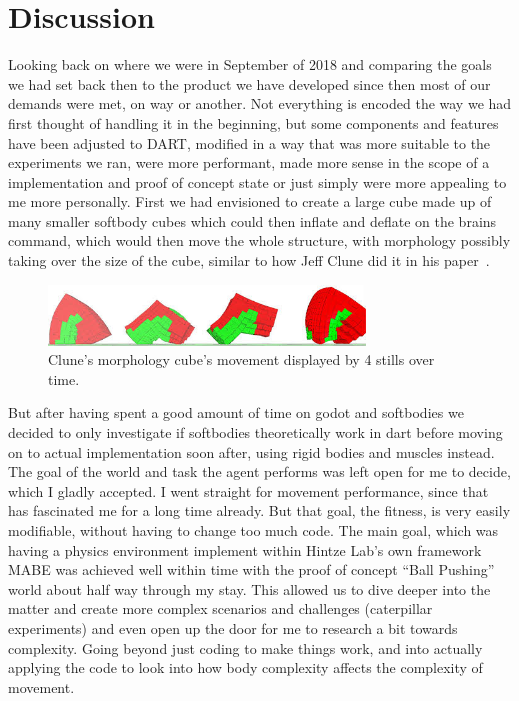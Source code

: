\documentclass[12pt,oneside,listof=totoc,paper=a4,headings=small]{scrbook}
\begin{document}
\section{Discussion}
Looking back on where we were in September of 2018 and comparing the goals we had set back then to the product we have developed since then most of our demands were met, on way or another. Not everything is encoded the way we had first thought of handling it in the beginning, but some components and features have been adjusted to DART, modified in a way that was more suitable to the experiments we ran, were more performant, made more sense in the scope of a implementation and proof of concept state or just simply were more appealing to me more personally. First we had envisioned to create a large cube made up of many smaller softbody cubes which could then inflate and deflate on the brains command, which would then move the whole structure, with morphology possibly taking over the size of the cube, similar to how Jeff Clune did it in his paper~\cite{cheney2014unshackling}.


\begin{figure}[h!]
\centering
\includegraphics[width=0.75\textwidth,height=0.75\textheight,keepaspectratio]{images/clunecube.jpeg}
\caption{Clune's morphology cube's movement displayed by 4 stills over time.~\cite{cheney2014unshackling}}
\label{fig:clune}
\end{figure}


But after having spent a good amount of time on godot and softbodies we decided to only investigate if softbodies theoretically work in dart before moving on to actual implementation soon after, using rigid bodies and muscles instead. 
The goal of the world and task the agent performs was left open for me to decide, which I gladly accepted. I went straight for movement performance, since that has fascinated me for a long time already. But that goal, the fitness, is very easily modifiable, without having to change too much code.
The main goal, which was having a physics environment implement within Hintze Lab's own framework MABE was achieved well within time with the proof of concept ``Ball Pushing'' world about half way through my stay. This allowed us to dive deeper into the matter and create more complex scenarios and challenges (caterpillar experiments) and even open up the door for me to research a bit towards complexity. Going beyond just coding to make things work, and into actually applying the code to look into how body complexity affects the complexity of movement.
\end{document}
